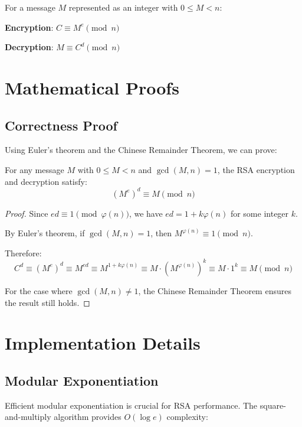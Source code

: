 	For a message $M$ represented as an integer with $0 \leq M < n$:
	
	\textbf{Encryption}: $C \equiv M^e \pmod{n}$
	
	\textbf{Decryption}: $M \equiv C^d \pmod{n}$
	
	\section{Mathematical Proofs}
	
	\subsection{Correctness Proof}
	
	Using Euler's theorem and the Chinese Remainder Theorem, we can prove:
	
	\begin{theorem}
		For any message $M$ with $0 \leq M < n$ and $\gcd(M, n) = 1$, the RSA encryption and decryption satisfy:
		\[
		(M^e)^d \equiv M \pmod{n}
		\]
	\end{theorem}
	
	\begin{proof}
		Since $ed \equiv 1 \pmod{\varphi(n)}$, we have $ed = 1 + k\varphi(n)$ for some integer $k$.
		
		By Euler's theorem, if $\gcd(M, n) = 1$, then $M^{\varphi(n)} \equiv 1 \pmod{n}$.
		
		Therefore:
		\[
		C^d \equiv (M^e)^d \equiv M^{ed} \equiv M^{1 + k\varphi(n)} \equiv M \cdot (M^{\varphi(n)})^k \equiv M \cdot 1^k \equiv M \pmod{n}
		\]
		
		For the case where $\gcd(M, n) \neq 1$, the Chinese Remainder Theorem ensures the result still holds.
	\end{proof}
	
	\section{Implementation Details}
	
	\subsection{Modular Exponentiation}
	
	Efficient modular exponentiation is crucial for RSA performance. The square-and-multiply algorithm provides $O(\log e)$ complexity:
	
